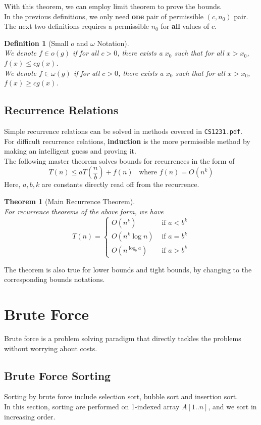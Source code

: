 \documentclass[12pt]{article}
\newtheorem{definition}{Definition}[section]
\newtheorem{theorem}{Theorem}[section]
\theoremstyle{definition}
\begin{document}
With this theorem, we can employ limit theorem to prove the bounds.\\
In the previous definitions, we only need \textbf{one} pair of permissible $(c,n_0)$ pair. The next two definitions requires a permissible $n_0$ for \textbf{all} values of $c$.
\begin{definition}[Small $o$ and $\omega$ Notation]
\hfill\\\normalfont We denote $f\in o(g)$ if for all $c>0$, there exists a $x_0$ such that for all $x>x_0$, $f(x)\leq cg(x)$.\\
We denote $f\in\omega(g)$ if for all $c>0$, there exists a $x_0$ such that for all $x>x_0$, $f(x)\geq cg(x)$.
\end{definition}
\subsection{Recurrence Relations}
Simple recurrence relations can be solved in methods covered in \texttt{CS1231.pdf}.\\
For difficult recurrence relations, \textbf{induction} is the more permissible method by making an intelligent guess and proving it.\\
The following master theorem solves bounds for recurrences in the form of
\[
T(n)\leq aT(\frac{n}{b})+f(n)\;\;\;\text{where }f(n)=O(n^k)
\] 
Here, $a, b, k$ are constants directly read off from the recurrence.
\begin{theorem}[Main Recurrence Theorem]
\hfill\\\normalfont For recurrence theorems of the above form, we have
\[
T(n)=\begin{cases}
O(n^k)&\text{ if }a<b^k\\
O(n^k\log n)&\text{ if }a=b^k\\
O(n^{\log_ba})&\text{ if }a>b^k
\end{cases}
\]
\end{theorem}
The theorem is also true for lower bounds and tight bounds, by changing to the corresponding bounds notations.
\clearpage
\section{Brute Force}
Brute force is a problem solving paradigm that directly tackles the problems without worrying about costs.\\
\subsection{Brute Force Sorting}
Sorting by brute force include selection sort, bubble sort and insertion sort.\\
In this section, sorting are performed on 1-indexed array $A[1..n]$, and we sort in increasing order.
\end{document}
